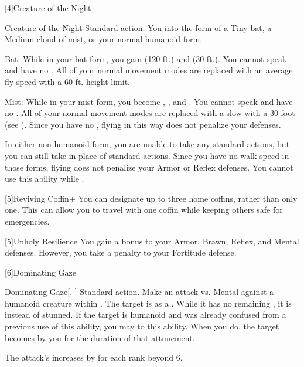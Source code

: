     [4]{Creature of the Night}
      \begin{magicalattuneability}{Creature of the Night}{}
        \abilityusagetime Standard action.
        \rankline
        You  into the form of a Tiny bat, a Medium cloud of mist, or your normal humanoid form.
        \begin{raggeditemize}
          \item Bat: While in your bat form, you gain  (120 ft.) and  (30 ft.).
            You cannot speak and have no .
            All of your normal movement modes are replaced with an average fly speed with a 60 ft. height limit.
          \item Mist: While in your mist form, you become , , and .
            You cannot speak and have no .
            All of your normal movement modes are replaced with a slow  with a 30 foot  (see ).
            Since you have no , flying in this way does not penalize your defenses.
        \end{raggeditemize}

        In either non-humanoid form, you are unable to take any standard actions, but you can still take  in place of standard actions.
        Since you have no walk speed in those forms, flying does not penalize your Armor or Reflex defenses.
        You cannot use this ability while \paralyzed.
      \end{magicalattuneability}

    [5]{Reviving Coffin+} You can designate up to three home coffins, rather than only one.
      This can allow you to travel with one coffin while keeping others safe for emergencies.

    [5]{Unholy Resilience} You gain a  bonus to your Armor, Brawn, Reflex, and Mental defenses.
      However, you take a  penalty to your Fortitude defense.

    [6]{Dominating Gaze}
      \begin{magicalactiveability}{Dominating Gaze}[, ]
        \abilityusagetime Standard action.
        \rankline
        Make an attack vs. Mental against a humanoid creature within \shortrange.
        \hit The target is \stunned as a .
        While it has no remaining , it is \confused instead of stunned.
        \crit If the target is humanoid and was already confused from a previous use of this ability, you may  to this ability.
        When you do, the target becomes \dominated by you for the duration of that attunement.

        \rankline
        The attack's  increases by  for each rank beyond 6.
      \end{magicalactiveability}

